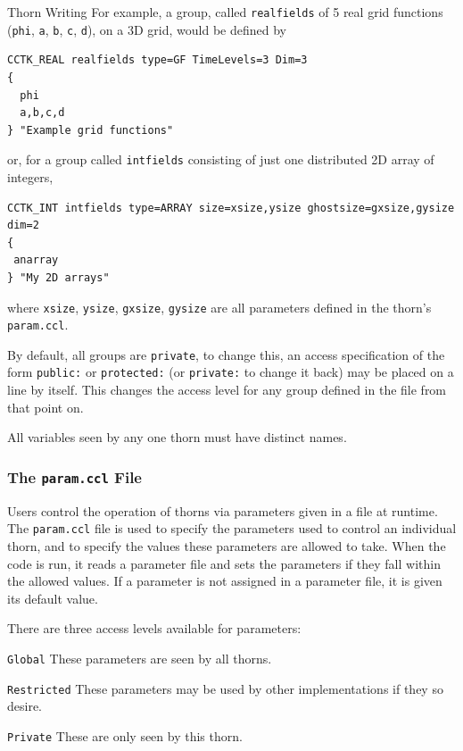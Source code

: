 \begin{cactuspart}{Thorn Writing}
For example, a group, called \texttt{realfields} of 5 real grid
functions (\texttt{phi}, \texttt{a},
\texttt{b}, \texttt{c}, \texttt{d}), on a 3D grid, would be defined by
\begin{verbatim}
CCTK_REAL realfields type=GF TimeLevels=3 Dim=3
{
  phi
  a,b,c,d
} "Example grid functions"
\end{verbatim}
or, for a group called \texttt{intfields} consisting of just one
distributed 2D array of integers,
\begin{verbatim}
CCTK_INT intfields type=ARRAY size=xsize,ysize ghostsize=gxsize,gysize dim=2
{
 anarray
} "My 2D arrays"
\end{verbatim}
where \texttt{xsize}, \texttt{ysize}, \texttt{gxsize}, \texttt{gysize} are all
parameters defined in the thorn's \texttt{param.ccl}.


By default, all groups are \texttt{private}, to change this, an access
specification of the form \texttt{public:} or \texttt{protected:} (or
\texttt{private:} to change it back) may be placed on a line by itself.  This
changes the access level for any group defined in the file from that point on.

All variables seen by any one thorn must have distinct names.

\subsubsection{The \texttt{param.ccl} File}
\label{subsec:param_ccl}

Users control the operation of thorns via parameters given in a file
at runtime.  The \texttt{param.ccl} file
is used to specify the parameters used to control an individual thorn, and
to specify the values these parameters are allowed to take.  When the code
is run, it reads a parameter file and sets the parameters if they fall
within the allowed values. If a parameter is not assigned in a parameter
file, it is given its default value.

There are three access levels available for parameters:

\begin{Lentry}
\item [\texttt{Global}]
These parameters are seen by all thorns.
\item [\texttt{Restricted}]
These parameters may be used by other implementations if they so desire.
\item [\texttt{Private}]
These are only seen by this thorn.
\end {Lentry}


\end{cactuspart}
